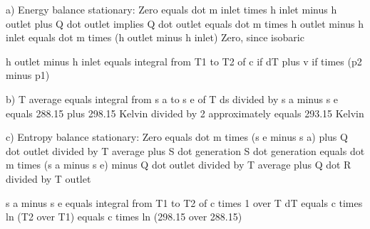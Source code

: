 a) Energy balance stationary:  
Zero equals dot m inlet times h inlet minus h outlet plus Q dot outlet  
implies Q dot outlet equals dot m times h outlet minus h inlet  
equals dot m times (h outlet minus h inlet)  
Zero, since isobaric  

h outlet minus h inlet equals integral from T1 to T2 of c if dT plus v if times (p2 minus p1)

b) T average equals integral from s a to s e of T ds divided by s a minus s e  
equals 288.15 plus 298.15 Kelvin divided by 2  
approximately equals 293.15 Kelvin  

c) Entropy balance stationary:  
Zero equals dot m times (s e minus s a) plus Q dot outlet divided by T average plus S dot generation  
S dot generation equals dot m times (s a minus s e) minus Q dot outlet divided by T average plus Q dot R divided by T outlet  

s a minus s e equals integral from T1 to T2 of c times 1 over T dT equals c times ln (T2 over T1)  
equals c times ln (298.15 over 288.15)